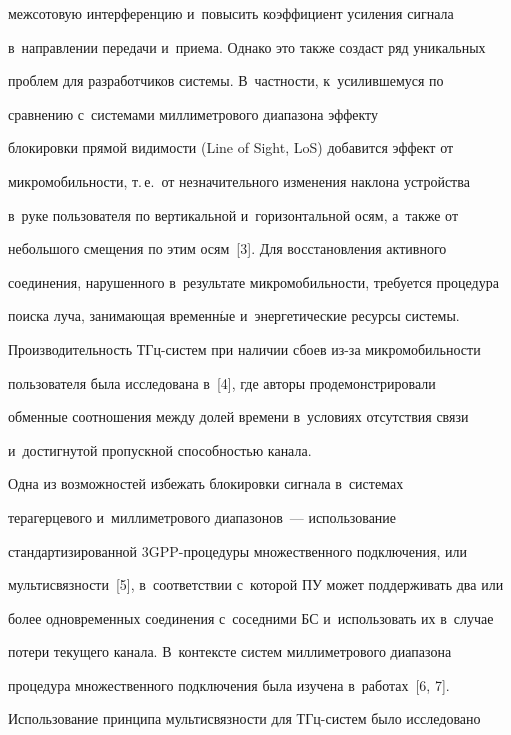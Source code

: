 межсотовую интерференцию и~повысить коэффициент усиления сигнала 


в~на\-прав\-ле\-нии передачи и~приема. Однако это так\-же создаст ряд уникальных 


проб\-лем для разработчиков сис\-те\-мы. В~част\-ности, к~усилившемуся по 


сравнению с~сис\-те\-ма\-ми мил\-ли\-мет\-ро\-во\-го диапазона эффекту 


блокировки прямой видимости (Line of Sight, LoS) добавится эффект от 


мик\-ро\-мо\-биль\-ности, т.\,е.\ от незначительного изменения наклона устройства 


в~руке пользователя по вертикальной и~горизонтальной осям, а~также от 


небольшого смещения по этим осям~[3]. Для восстановления активного 


со\-еди\-не\-ния, нарушенного в~результате мик\-ро\-мо\-биль\-ности, требуется процедура 


поиска луча, за\-ни\-ма\-ющая временн$\acute{\mbox{ы}}$е и~энергетические ресурсы сис\-те\-мы. 


Про\-из\-во\-ди\-тель\-ность ТГц-сис\-тем при наличии сбоев из-за мик\-ро\-мо\-биль\-ности 


пользователя была исследована в~[4], где авторы продемонстрировали 


обменные соотношения между долей времени в~условиях отсутствия связи 


и~достигнутой про\-пуск\-ной спо\-соб\-ностью канала.


  


  Одна из возможностей избежать блокировки сигнала в~сис\-те\-мах 


терагерцевого и~мил\-ли\-мет\-ро\-во\-го диа\-па\-зо\-нов~--- использование 


стандартизированной 3GPP-про\-це\-ду\-ры множественного под\-клю\-че\-ния, или 


муль\-ти\-связ\-ности~[5], в~соответствии с~которой ПУ может поддерживать два или 


более одновременных соединения с~соседними БС и~использовать их в~случае 


потери текущего канала. В~контексте сис\-тем мил\-ли\-мет\-ро\-во\-го диапазона 


процедура множественного подключения была изучена в~работах~[6, 7]. 


Использование принципа муль\-ти\-связ\-ности для ТГц-сис\-тем было исследовано 


